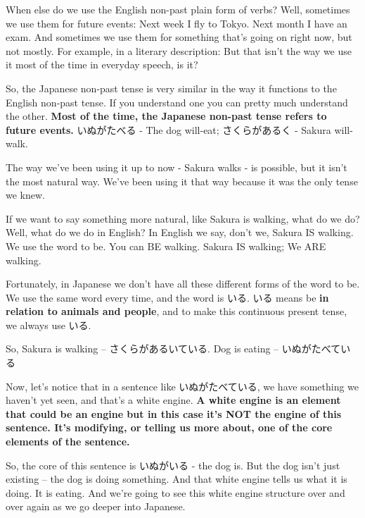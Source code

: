 When else do we use the English non-past plain form of verbs? Well, sometimes we use them for future events: Next week I fly to Tokyo. Next month I have an exam. And sometimes we use them for something that's going on right now, but not mostly. For example, in a literary description:  But that isn't the way we use it most of the time in everyday speech, is it?

So, the Japanese non-past tense is very similar in the way it functions to the English non-past tense. If you understand one you can pretty much understand the other. {\bf Most of the time, the Japanese non-past tense refers to future events.} いぬがたべる - The dog will-eat; さくらがあるく - Sakura will-walk.

{}

The way we've been using it up to now - Sakura walks - is possible, but it isn't the most natural way. We've been using it that way because it was the only tense we knew.

\stopsectionlevel

\startsectionlevel[title={Continuous actions and ている},reference={continuous-actions-and-ている}]

If we want to say something more natural, like Sakura is walking, what do we do? Well, what do we do in English? In English we say, don't we, Sakura IS walking. We use the word to be. You can BE walking. Sakura IS walking; We ARE walking.

Fortunately, in Japanese we don't have all these different forms of the word to be. We use the same word every time, and the word is いる. いる means be {\bf in relation to animals and people}, and to make this continuous present tense, we always use いる.

So, Sakura is walking -- さくらがあるいている. Dog is eating -- いぬがたべている

{}

Now, let's notice that in a sentence like いぬがたべている, we have something we haven't yet seen, and that's a white engine. {\bf A white engine is an element that could be an engine but in this case it's NOT the engine of this sentence. It's modifying, or telling us more about, one of the core elements of the sentence.}

{}

So, the core of this sentence is いぬがいる - the dog is. But the dog isn't just existing -- the dog is doing something. And that white engine tells us what it is doing. It is eating. And we're going to see this white engine structure over and over again as we go deeper into Japanese.


